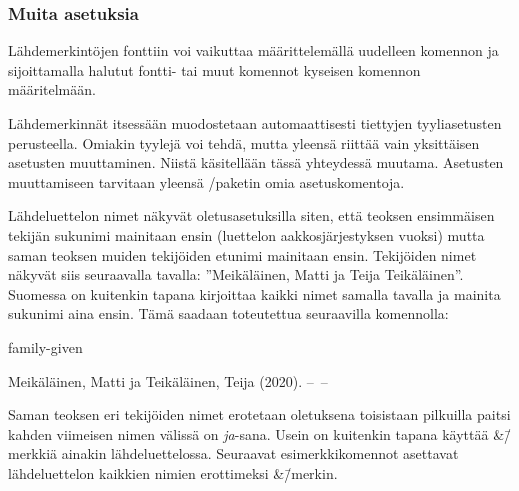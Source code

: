 \begin{koodilohkosis}
  \setlength{\bibitemsep}{.5ex plus .1ex minus .1ex}
  \setlength{\bibnamesep}{1em  plus .2ex minus .1ex}
  \setlength{\bibinitsep}{2em  plus .2ex minus .1ex}
\end{koodilohkosis}

\subsubsection{Muita asetuksia}

Lähdemerkintöjen fonttiin voi vaikuttaa määrittelemällä uudelleen
komennon  ja sijoittamalla halutut fontti- tai muut
komennot kyseisen komennon määritelmään.

\begin{koodilohkosis}
  \renewcommand{\bibfont}{\sffamily\small}
\end{koodilohkosis}

Lähdemerkinnät itsessään muodostetaan automaattisesti tiettyjen
tyyliasetusten perusteella. Omiakin tyylejä voi tehdä, mutta yleensä
riittää vain yksittäisen asetusten muuttaminen. Niistä käsitellään tässä
yhteydessä muutama. Asetusten muuttamiseen tarvitaan yleensä
\-/paketin omia asetuskomentoja.

Lähdeluettelon nimet näkyvät oletusasetuksilla siten, että teoksen
ensimmäisen tekijän sukunimi mainitaan ensin (luettelon
aakkosjärjestyksen vuoksi) mutta saman teoksen muiden tekijöiden etunimi
mainitaan ensin. Tekijöiden nimet näkyvät siis seuraavalla tavalla:
''Meikäläinen, Matti ja Teija Teikäläinen''. Suomessa on kuitenkin
tapana kirjoittaa kaikki nimet samalla tavalla ja mainita sukunimi aina
ensin. Tämä saadaan toteutettua seuraavilla komennolla:

\begin{koodilohkosis}
   {family-given}
\end{koodilohkosis}

\begin{tulossis}
  Meikäläinen, Matti ja Teikäläinen, Teija (2020). --~--
\end{tulossis}

Saman teoksen eri tekijöiden nimet erotetaan oletuksena toisistaan
pilkuilla paitsi kahden viimeisen nimen välissä on \textit{ja}-sana.
Usein on kuitenkin tapana käyttää \&\=/merkkiä ainakin lähdeluettelossa.
Seuraavat esimerkkikomennot asettavat lähdeluettelon kaikkien nimien
erottimeksi \&\=/merkin.

